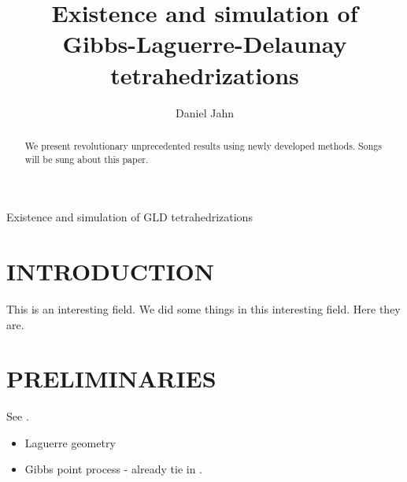 \documentclass{kybernetika}
\begin{document}
\pagestyle{myheadings}




\title{Existence and simulation of \\ Gibbs-Laguerre-Delaunay tetrahedrizations} 

\author{Daniel Jahn}


 {Existence and simulation of GLD tetrahedrizations}

\maketitle

\begin{abstract}
We present revolutionary unprecedented results using newly developed methods. Songs will be sung about this paper. 
\end{abstract}



% 

\section{INTRODUCTION}
This is an interesting field. We did some things in this interesting field. Here they are.

\section{PRELIMINARIES}
See \cite{D17}.
\begin{itemize}
\item Laguerre geometry
\item Gibbs point process - already tie in \cite{DDG12}.
\end{itemize}
\end{document}
